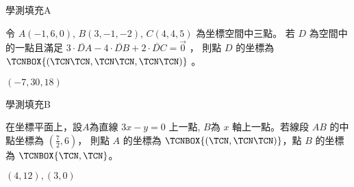 \begin{QUESTIONS}
    \begin{QUESTION}
        \begin{ExamInfo}{97}{學測}{填充}{A}
        \end{ExamInfo}
        \begin{ExamAnsRateInfo}{47}{82}{51}{8}
        \end{ExamAnsRateInfo}
        \begin{QBODY}
            令 $A(-1,6,0)$, $B(3,-1,-2)$, $C(4,4,5)$ 為坐標空間中三點。
			若 $D$ 為空間中的一點且滿足 $3 \cdot \lvec{DA} -  4 \cdot \lvec{DB} + 2\cdot\lvec{DC}= \vec{0}$ ，
			則點 $D$ 的坐標為 $\TCNBOX{(\TCN\TCN,\TCN\TCN,\TCN\TCN)}$ 。
        \end{QBODY}
        \begin{QFROMS}
        \end{QFROMS}
        \begin{QTAGS}\end{QTAGS}
        \begin{QANS}
            $(-7,30,18)$
        \end{QANS}
        \begin{QSOLLIST}
        \end{QSOLLIST}
        \begin{QEMPTYSPACE}
        \end{QEMPTYSPACE}
    \end{QUESTION}
    \begin{QUESTION}
        \begin{ExamInfo}{97}{學測}{填充}{B}
        \end{ExamInfo}
        \begin{ExamAnsRateInfo}{63}{96}{75}{18}
        \end{ExamAnsRateInfo}
        \begin{QBODY}
            在坐標平面上，設$A$為直線 $3x-y=0$ 上一點, $B$為 $x$ 軸上一點。若線段 $AB$ 的中點坐標為 $(\frac{7}{2},6)$， 則點 $A$ 的坐標為 $\TCNBOX{(\TCN,\TCN\TCN)}$，點 $B$ 的坐標為 $\TCNBOX{\TCN,\TCN}$。
        \end{QBODY}
        \begin{QFROMS}
        \end{QFROMS}
        \begin{QTAGS}\end{QTAGS}
        \begin{QANS}
            $(4,12), (3,0)$

\end{QANS}
\end{QUESTION}
\end{QUESTIONS}
